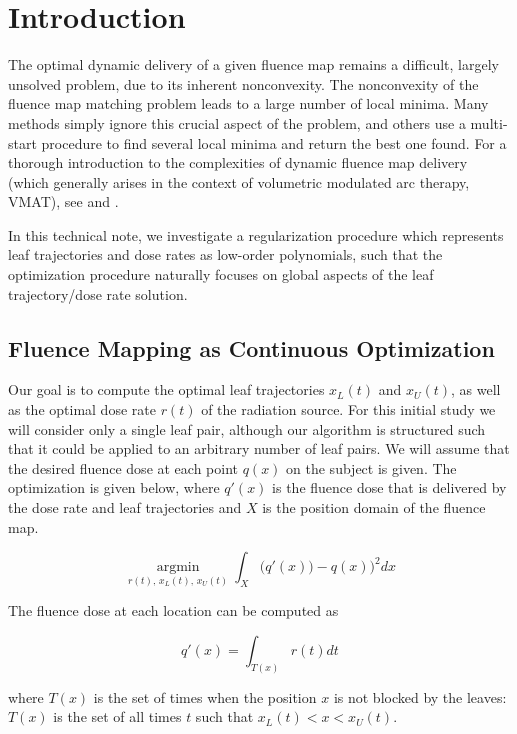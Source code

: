 \section{Introduction}
The optimal dynamic delivery of a given fluence map remains a difficult, largely unsolved problem, due to its inherent nonconvexity.
The nonconvexity of the fluence map matching problem leads to a large number of local minima. 
Many methods simply ignore this crucial aspect of the problem, and others use a multi-start procedure to find several local minima and return the best one found. 
For a thorough introduction to the complexities of dynamic fluence map delivery (which generally arises in the context of volumetric modulated arc therapy, VMAT),
see \cite{balvertcraft} and \cite{unkvmatreview}.

In this technical note, we investigate a regularization procedure which represents leaf trajectories and dose rates as low-order polynomials,
such that the optimization procedure naturally focuses on global aspects of the leaf trajectory/dose rate solution.

\subsection{Fluence Mapping as Continuous Optimization}

Our goal is to compute the optimal leaf trajectories $x_L(t)$ and $x_U(t)$, as well as the optimal dose rate $r(t)$ of the radiation source.
For this initial study we will consider only a single leaf pair, although our algorithm is structured such that it could be applied to an arbitrary number of leaf pairs.
We will assume that the desired fluence dose at each point $q(x)$ on the subject is given.
The optimization is given below, where $q'(x)$ is the fluence dose that is delivered by the
dose rate and leaf trajectories and $X$ is the position domain of the fluence map.

\begin{equation}
\underset{r(t), \, x_L(t), \, x_U(t)}{\operatorname{argmin}}
\int_X \bigg(q'(x)) - q(x)\bigg)^2 dx
\label{eqn:fluenceMapOptimization}
\end{equation}

The fluence dose at each location can be computed as

\begin{equation}
q'(x) = \int_{T(x)} r(t) dt
\label{eqn:deliveredFluenceDose}
\end{equation}

where $T(x)$ is the set of times when the position $x$ is not blocked by the leaves:
$T(x)$ is the set of all times $t$ such that $ x_L(t) < x < x_U(t)$.
